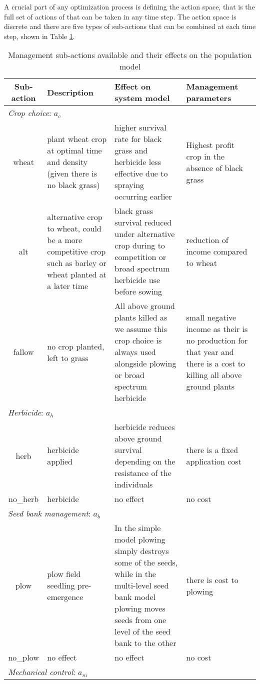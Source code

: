 \documentclass[12pt, a4paper]{article}
\begin{document}
A crucial part of any optimization process is defining the action space, that is the full set of actions of that can be taken in any time step. The action space is discrete and there are five types of sub-actions that can be combined at each time step, shown in Table \ref{table:actions}. 
\begin{longtable}[h]{c p{4.1cm} p{4.1cm} p{4.1cm}}
\caption{Management sub-actions available and their effects on the population model\label{table:actions}}\\
	\hline
	\textbf{Sub-action} & \textbf{Description} & \textbf{Effect on system model} & \textbf{Management parameters}\\
	\hline	
	\multicolumn{4}{l}{\textit{Crop choice}: $a_c$}\\
	wheat & plant wheat crop at optimal time and density (given there is no black grass) & higher survival rate for black grass and herbicide less effective due to spraying occurring earlier & Highest profit crop in the absence of black grass \\
	alt & alternative crop to wheat, could be a more competitive crop such as barley or wheat planted at a later time & black grass survival reduced under alternative crop during to competition or broad spectrum herbicide use before sowing & reduction of income compared to wheat\\
	fallow & no crop planted, left to grass & All above ground plants killed as we assume this crop choice is always used alongside plowing or broad spectrum herbicide & small negative income as their is no production for that year and there is a cost to killing all above ground plants\\
	\multicolumn{4}{l}{\textit{Herbicide}: $a_h$}\\
	herb & herbicide applied & herbicide reduces above ground survival depending on the resistance of the individuals & there is a fixed application cost\\ 
	no\_herb & herbicide & no effect & no cost\\
	\multicolumn{4}{l}{\textit{Seed bank management}: $a_b$}\\
	plow & plow field seedling pre-emergence & In the simple model plowing simply destroys some of the seeds, while in the multi-level seed bank model plowing moves seeds from one level of the seed bank to the other & there is cost to plowing\\
	no\_plow & no effect & no effect & no cost\\
	\multicolumn{4}{l}{\textit{Mechanical control}: $a_m$}\\ 

\end{longtable}
\end{document}
